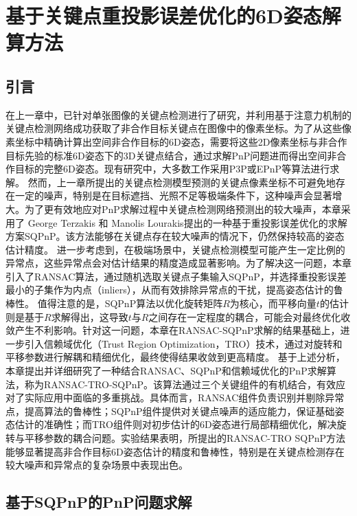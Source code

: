 \chapter{基于关键点重投影误差优化的6D姿态解算方法}
\label{chap:RANSAC-TRO-SQPnP}

\section{引言}
\label{sec:RANSAC-TRO-SQPnP:intro}
在上一章中，已针对单张图像的关键点检测进行了研究，并利用基于注意力机制的关键点检测网络成功获取了非合作目标关键点在图像中的像素坐标。为了从这些像素坐标中精确计算出空间非合作目标的6D姿态，需要将这些2D像素坐标与非合作目标先验的标准6D姿态下的3D关键点结合，通过求解PnP问题进而得出空间非合作目标的完整6D姿态。现有研究中，大多数工作采用P3P\cite{chen2019satellite,s22218541,Guo_2022}或EPnP\cite{li2022learning,huan2020pose,lotti2022investigating}等算法进行求解。
然而，上一章所提出的关键点检测模型预测的关键点像素坐标不可避免地存在一定的噪声，特别是在目标遮挡、光照不足等极端条件下，这种噪声会显著增大。为了更有效地应对PnP求解过程中关键点检测网络预测出的较大噪声，本章采用了 George Terzakis 和 Manolis Lourakis提出的一种基于重投影误差优化的求解方案SQPnP\cite{terzakis2020consistently}。该方法能够在关键点存在较大噪声的情况下，仍然保持较高的姿态估计精度。
进一步考虑到，在极端场景中，关键点检测模型可能产生一定比例的异常点，这些异常点会对估计结果的精度造成显著影响。为了解决这一问题，本章引入了RANSAC算法，通过随机选取关键点子集输入SQPnP，并选择重投影误差最小的子集作为内点（inliers），从而有效排除异常点的干扰，提高姿态估计的鲁棒性。
值得注意的是，SQPnP算法以优化旋转矩阵$R$为核心，而平移向量$t$的估计则是基于$R$求解得出，这导致$t$与$R$之间存在一定程度的耦合，可能会对最终优化收敛产生不利影响。针对这一问题，本章在RANSAC-SQPnP求解的结果基础上，进一步引入信赖域优化（Trust Region Optimization，TRO）技术，通过对旋转和平移参数进行解耦和精细优化，最终使得结果收敛到更高精度。
基于上述分析，本章提出并详细研究了一种结合RANSAC、SQPnP和信赖域优化的PnP求解算法，称为RANSAC-TRO-SQPnP。该算法通过三个关键组件的有机结合，有效应对了实际应用中面临的多重挑战。具体而言，RANSAC组件负责识别并剔除异常点，提高算法的鲁棒性；SQPnP组件提供对关键点噪声的适应能力，保证基础姿态估计的准确性；而TRO组件则对初步估计的6D姿态进行局部精细优化，解决旋转与平移参数的耦合问题。实验结果表明，所提出的RANSAC-TRO SQPnP方法能够显著提高非合作目标6D姿态估计的精度和鲁棒性，特别是在关键点检测存在较大噪声和异常点的复杂场景中表现出色。


\section{基于SQPnP的PnP问题求解}
\label{sec:RANSAC-TRO-SQPnP:SQPnP}
\vspace{1ex}


